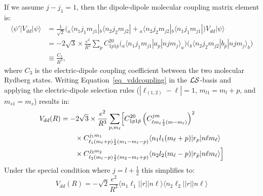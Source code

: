 If we assume $j - j_1 = 1$, then the dipole-dipole molecular coupling matrix element is:
\begin{equation}
  \label{eq_vddcoupling}
  \begin{split}
    \langle\psi'|V_{dd}|\psi\rangle 
      &= \frac{1}{\sqrt{2}}\bigg( {_a}\langle n_1 j_1 m_{j1}| {_b}\langle n_2 j_2 m_{j2}| + {_a}\langle n_2 j_2 m_{j2}| {_b}\langle n_1 j_1 m_{j1}| \bigg) V_{dd}|\psi\rangle \\
      &= -2\sqrt{3}\times\frac{e^2}{R^3}\sum_pC_{1p1\bar{p}}^{20}\bigg({_a}\langle n_1 j_1 m_{j1}| a_p|njm_j\rangle_a\bigg)\bigg({_b}\langle n_2 j_2 m_{j2}| b_{\bar{p}}|njm_j\rangle_b\bigg)\\
      &\equiv \frac{C_3}{R^3},
  \end{split}
\end{equation}
where $C_3$ is the electric-dipole coupling coefficient between the two molecular Rydberg states.
Writing Equation~\ref{eq_vddcoupling} in the $\cal LS$-basis and applying the electric-dipole selection rules ($|\ell_{(1,2)}-\ell|=1$, $m_{l1}=m_l+p$, and $m_{s1}=m_s$) results in:
\begin{equation}
  \label{eq_vddls}
  \begin{split}
    V_{dd}(R) &= -2\sqrt{3}\times\frac{e^2}{R^3}\sum_{p,m_{\ell}} \Bigl[ C_{1p1\bar{p}}^{20} \left(C_{\ell m_{\ell}\frac{1}{2}(m-m_{\ell})}^{jm}\right)^2 \\
                &\qquad \times C_{\ell_{1}(m_{\ell}+p)\frac{1}{2}(m_1-m_{\ell}-p)}^{j_1m_1}\langle n_1l_1(m_{\ell}+p)|r_p|n\ell m_{\ell}\rangle\\
                &\qquad \times C_{\ell_{2}(m_{\ell}-p)\frac{1}{2}(m_2-m_{\ell}+p)}^{j_2m_2}\langle n_2l_2(m_{\ell}-p)|r_{\bar{p}}|n\ell m_{\ell} \rangle \Bigr]
  \end{split}
\end{equation}
Under the special condition where $j=l+\frac{1}{2}$ this simplifies to:
\begin{equation}
  \label{eq_vddls}
    V_{dd}(R) = -\sqrt{2}\frac{e^2}{R^3}
               \langle n_1 \ell_1|| r || n \ell \rangle \langle n_2 \ell_2 ||r || n \ell \rangle
\end{equation}


